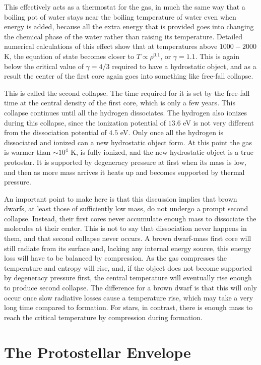 This effectively acts as a thermostat for the gas, in much the same way that a boiling pot of water stays near the boiling temperature of water even when energy is added, because all the extra energy that is provided goes into changing the chemical phase of the water rather than raising its temperature. Detailed numerical calculations of this effect show that at temperatures above $1000-2000$ K, the equation of state becomes closer to $T\propto \rho^{0.1}$, or $\gamma=1.1$. This is again below the critical value of $\gamma=4/3$ required to have a hydrostatic object, and as a result the center of the first core again goes into something like free-fall collapse.

This is called the second collapse. The time required for it is set by the free-fall time at the central density of the first core, which is only a few years. This collapse continues until all the hydrogen dissociates. The hydrogen also ionizes during this collapse, since the ionization potential of $13.6$ eV is not very different from the dissociation potential of $4.5$ eV. Only once all the hydrogen is dissociated and ionized can a new hydrostatic object form. At this point the gas is warmer than $\sim 10^4$ K, is fully ionized, and the new hydrostatic object is a true protostar. It is supported by degeneracy pressure at first when its mass is low, and then as more mass arrives it heats up and becomes supported by thermal pressure. 

An important point to make here is that this discussion implies that brown dwarfs, at least those of sufficiently low mass, do not undergo a prompt second collapse. Instead, their first cores never accumulate enough mass to dissociate the molecules at their center. This is not to say that dissociation never happens in them, and that second collapse never occurs. A brown dwarf-mass first core will still radiate from its surface and, lacking any internal energy source, this energy loss will have to be balanced by compression. As the gas compresses the temperature and entropy will rise, and, if the object does not become supported by degeneracy pressure first, the central temperature will eventually rise enough to produce second collapse. The difference for a brown dwarf is that this will only occur once slow radiative losses cause a temperature rise, which may take a very long time compared to formation. For stars, in contrast, there is enough mass to reach the critical temperature by compression during formation.

\section{The Protostellar Envelope}

